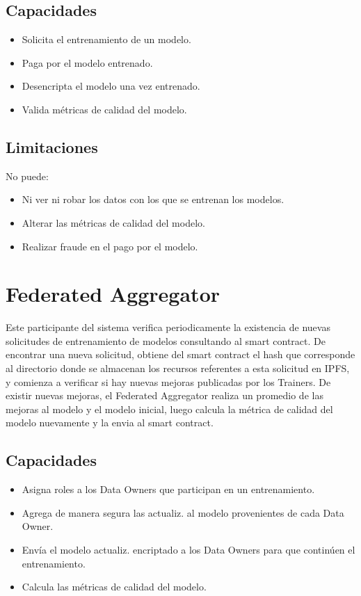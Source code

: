 \documentclass[
11pt, %
oneside, %
spanish, %
singlespacing, %
parskip, %
headsepline, %
chapterinoneline, %
]{MastersDoctoralThesis} %
\begin{document}
\subsection*{Capacidades}
\begin{itemize}
\item Solicita el entrenamiento de un modelo.
\item Paga por el modelo entrenado.
\item Desencripta el modelo una vez entrenado.
\item Valida métricas de calidad del modelo.
\end{itemize}

\subsection*{Limitaciones}
No puede:
\begin{itemize}
\item Ni ver ni robar los datos con los que se entrenan los modelos.
\item Alterar las métricas de calidad del modelo.
\item Realizar fraude en el pago por el modelo.
\end{itemize}



\section{Federated Aggregator}
Este participante del sistema verifica periodicamente la existencia de nuevas solicitudes de entrenamiento de modelos consultando al smart contract. De encontrar una nueva solicitud, obtiene del smart contract el hash que corresponde al directorio donde se almacenan los recursos referentes a esta solicitud en IPFS, y comienza a verificar si hay nuevas mejoras publicadas por los Trainers. De existir nuevas mejoras, el Federated Aggregator realiza un promedio de las mejoras al modelo y el modelo inicial, luego calcula la métrica de calidad del modelo nuevamente y la envia al smart contract.

\subsection*{Capacidades}
\begin{itemize}
\item Asigna roles a los Data Owners que participan en un entrenamiento.
\item Agrega de manera segura las actualiz. al modelo provenientes de cada Data Owner.
\item Envía el modelo actualiz. encriptado a los Data Owners para que continúen el entrenamiento.
\item Calcula las métricas de calidad del modelo.
\end{itemize}
\end{document}
